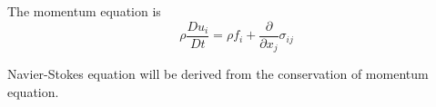 \newslide
The momentum equation is
\begin{equation}\label{mom:eq}
    \boxed{\rho\frac{D u_i}{D t} = \rho f_i + \frac{\partial}{\partial
    x_j}\sigma_{ij}}
\end{equation}

Navier-Stokes equation will be derived from the conservation of
momentum equation.

